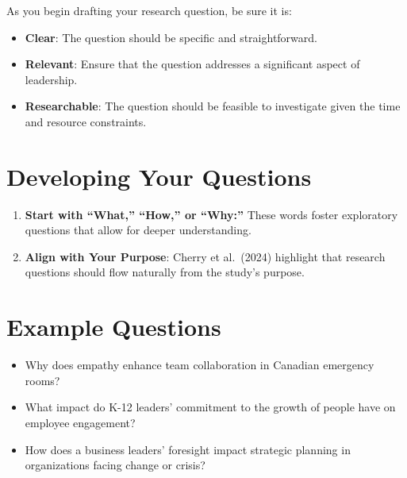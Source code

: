 \documentclass[
  letterpaper,
  DIV=11,
  numbers=noendperiod]{scrreprt}
\providecommand{\tightlist}{%
  \setlength{\itemsep}{0pt}\setlength{\parskip}{0pt}}\usepackage{longtable,booktabs,array}
\begin{document}
As you begin drafting your research question, be sure it is:

\begin{itemize}
\tightlist
\item
  \textbf{Clear}: The question should be specific and straightforward.
\item
  \textbf{Relevant}: Ensure that the question addresses a significant
  aspect of leadership.
\item
  \textbf{Researchable}: The question should be feasible to investigate
  given the time and resource constraints.
\end{itemize}

\section*{Developing Your Questions}\label{developing-your-questions}


\begin{enumerate}
\def\labelenumi{\arabic{enumi}.}
\tightlist
\item
  \textbf{Start with ``What,'' ``How,'' or ``Why:''} These words foster
  exploratory questions that allow for deeper understanding.
\item
  \textbf{Align with Your Purpose}: Cherry et al.~(2024) highlight that
  research questions should flow naturally from the study's purpose.
\end{enumerate}

\section*{Example Questions}\label{example-questions}


\begin{itemize}
\tightlist
\item
  Why does empathy enhance team collaboration in Canadian emergency
  rooms?
\item
  What impact do K-12 leaders' commitment to the growth of people have
  on employee engagement?
\item
  How does a business leaders' foresight impact strategic planning in
  organizations facing change or crisis?
\end{itemize}
\end{document}
